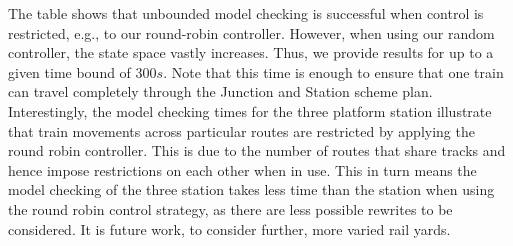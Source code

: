 The table shows that unbounded model checking is successful when
control is restricted, e.g., to our round-robin controller. However,
when using our random controller, the state space vastly
increases. Thus, we provide results for up to a given time bound of
$300s$. Note that this time is enough to ensure that one train can
travel completely through the Junction and Station scheme
plan. Interestingly, the model checking times for the three platform
station illustrate that train movements across particular routes are
restricted by applying the round robin controller. This is due to the
number of routes that share tracks and hence impose restrictions on
each other when in use. This in turn means the model checking of the
three station takes less time than the station when using the round
robin control strategy, as there are less possible rewrites to be
considered. It is future work, to consider further, more varied rail
yards.
